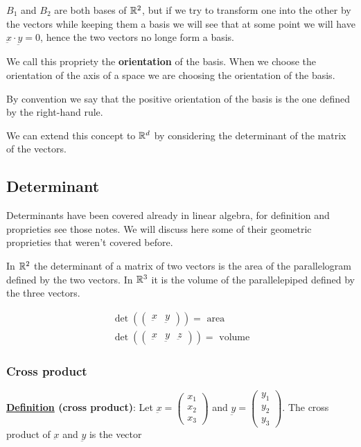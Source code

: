 \documentclass[10pt]{extarticle}
\renewcommand{\vec}[1]{\underbar{\ensuremath{#1}}}
\begin{document}
$B_1$ and $B_2$ are both bases of $\mathbb{R}^2$, but if we try to  transform one into the other by  the vectors
while keeping them a basis we will see that at some point we will have $\vec{x} \cdot \vec{y} = 0$,
hence the two vectors no longe form a basis.

We call this propriety the \textbf{orientation} of the basis.
When we choose the orientation of the axis of a space we are choosing the orientation of the basis.

By convention we say that the positive orientation of the basis is the one defined by the right-hand rule.

We can extend this concept to $\mathbb{R}^d$ by considering the determinant of the matrix of the vectors.

\subsection{Determinant}

Determinants have been covered already in linear algebra, for definition and proprieties see those notes.
We will discuss here some of their geometric proprieties that weren't covered before.

In $\mathbb{R}^2$ the determinant of a matrix of two vectors is the area of the parallelogram defined by the two vectors.
In $\mathbb{R}^3$ it is the volume of the parallelepiped defined by the three vectors.

\begin{gather*}
    \det \left( \begin{pmatrix}
            \vec{x} & \vec{y}
        \end{pmatrix} \right) = \text{ area} \\
    \det \left( \begin{pmatrix}
            \vec{x} & \vec{y} & \vec{z}
        \end{pmatrix} \right) = \text{ volume}
\end{gather*}

\subsubsection{Cross product}

\textbf{\underline{Definition} (cross product)}: Let $\vec{x} = \begin{pmatrix}
        x_1 \\ x_2 \\ x_3
    \end{pmatrix}$ and $\vec{y} = \begin{pmatrix}
        y_1 \\ y_2 \\ y_3
    \end{pmatrix}$.
The cross product of $\vec{x}$ and $\vec{y}$ is the vector
\end{document}
